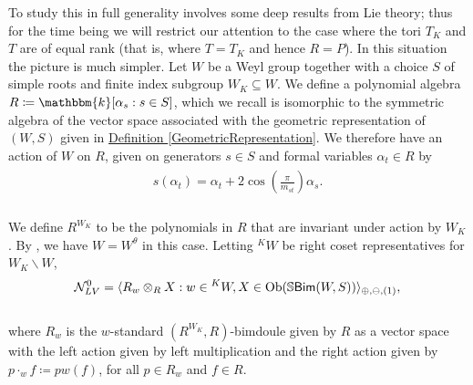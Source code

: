 \noindent To study this in full generality involves some deep results from Lie theory; thus for the time being we will restrict our attention to the case where the tori $T_K$ and $T$ are of equal rank (that is, where $T = T_K$ and hence $R = P$). In this situation the picture is much simpler. Let $W$ be a Weyl group together with a choice $S$ of simple roots and finite index subgroup $W_K \subseteq W$. We define a polynomial algebra $R \coloneqq \mathbbm{k}[\alpha_s : s \in S]$, which we recall is isomorphic to the symmetric algebra of the vector space associated with the geometric representation of $(W, S)$ given in \hyperref[GeometricRepresentation]{Definition \ref*{GeometricRepresentation}}. We therefore have an action of $W$ on $R$, given on generators $s \in S$ and formal variables $\alpha_t \in R$ by\\[-1.1\linespacing]
\begin{align*}
\begin{split}
s(\alpha_t) = \alpha_t + 2\cos\!\left(\frac{\pi}{m_{st}}\right)\!\alpha_s.
\end{split}
\end{align*}
\noindent\\[-0.7\linespacing] We define $R^{W_K}$ to be the polynomials in $R$ that are invariant under action by $W_K$. By \cite[Remark 6.2.4]{LR22}, we have $W = W^\theta$ in this case. Letting ${}^KW$ be right coset representatives for $W_K\backslash W$,\\[-1.2\linespacing]
\begin{align*}
\begin{split}
\mathcal{N}_{LV}^0 = \langle R_w \otimes_R X : w \in {}^KW, X \in \textnormal{Ob}(\mathbb{S}\textnormal{\textsf{Bim}}(W, S))\rangle_{\oplus,\ominus,(1)},
\end{split}
\end{align*}
\noindent\\[-1.2\linespacing] where $R_w$ is the $w$-standard $(R^{W_K}, R)$-bimdoule given by $R$ as a vector space with the left action given by left multiplication and the right action given by $p \cdot_w f \coloneqq p w(f)$, for all $p \in R_w$ and $f \in R$.\newpage


